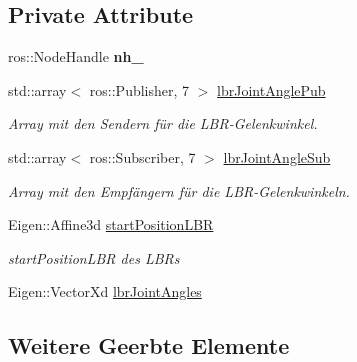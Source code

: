 \subsection*{Private Attribute}
\begin{DoxyCompactItemize}
\item 
\hypertarget{classNumericKinematicCommander_a942510355ffa740a33a32601f6b7e6e2}{ros\-::\-Node\-Handle {\bfseries nh\-\_\-}}\label{classNumericKinematicCommander_a942510355ffa740a33a32601f6b7e6e2}

\item 
\hypertarget{classNumericKinematicCommander_aa930d89ec967e9099682755f31ea2488}{std\-::array$<$ ros\-::\-Publisher, 7 $>$ \hyperlink{classNumericKinematicCommander_aa930d89ec967e9099682755f31ea2488}{lbr\-Joint\-Angle\-Pub}}\label{classNumericKinematicCommander_aa930d89ec967e9099682755f31ea2488}

\begin{DoxyCompactList}\small\item\em Array mit den Sendern für die L\-B\-R-\/\-Gelenkwinkel. \end{DoxyCompactList}\item 
\hypertarget{classNumericKinematicCommander_adcfc69d33dbe0e7214ad5da711ff4010}{std\-::array$<$ ros\-::\-Subscriber, 7 $>$ \hyperlink{classNumericKinematicCommander_adcfc69d33dbe0e7214ad5da711ff4010}{lbr\-Joint\-Angle\-Sub}}\label{classNumericKinematicCommander_adcfc69d33dbe0e7214ad5da711ff4010}

\begin{DoxyCompactList}\small\item\em Array mit den Empfängern für die L\-B\-R-\/\-Gelenkwinkeln. \end{DoxyCompactList}\item 
\hypertarget{classNumericKinematicCommander_ad24e6088164ea771b0047cd1a2e0f53e}{Eigen\-::\-Affine3d \hyperlink{classNumericKinematicCommander_ad24e6088164ea771b0047cd1a2e0f53e}{start\-Position\-L\-B\-R}}\label{classNumericKinematicCommander_ad24e6088164ea771b0047cd1a2e0f53e}

\begin{DoxyCompactList}\small\item\em start\-Position\-L\-B\-R des L\-B\-Rs \end{DoxyCompactList}\item 
Eigen\-::\-Vector\-Xd \hyperlink{classNumericKinematicCommander_af12b3f3e1d3058dd7cf93b923ab6f13b}{lbr\-Joint\-Angles}
\end{DoxyCompactItemize}
\subsection*{Weitere Geerbte Elemente}


